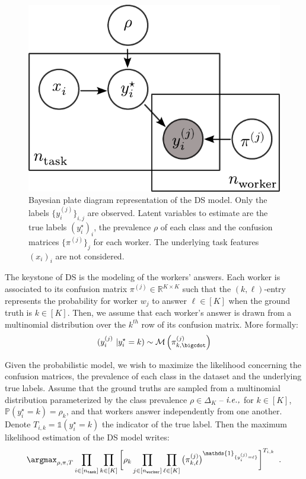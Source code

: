 \begin{figure}[htb]
    \centering
    \includegraphics[width=.65\textwidth]{chapters/images/bayesien_plaque_ds.pdf}
    \caption{Bayesian plate diagram representation of the DS model. Only the labels $\{y_i^{(j)}\}_{i,j}$ are observed. Latent variables to estimate are the true labels $(y_i^\star)_i$, the prevalence $\rho$ of each class and the confusion matrices $\{\pi^{(j)}\}_j$ for each worker. The underlying task features $(x_i)_i$ are not considered.}
    \label{fig:plaque_ds}
\end{figure}

The keystone of DS is the modeling of the workers' answers.
Each worker is associated to its confusion matrix $\pi^{(j)}\in\mathbb{R}^{K\times K}$ such that the $(k,\ell)$-entry represents the probability for worker $w_j$ to answer $\ell\in[K]$ when the ground truth is $k\in[K]$.
Then, we assume that each worker's answer is drawn from a multinomial distribution over the $k^{th}$ row of its confusion matrix.
More formally:
\begin{equation}\label{eq:ds_multinomial}
    (y_i^{(j)}\ | y_i^\star = k) \sim \mathcal{M}\left(\pi^{(j)}_{k,\bigcdot}\right)
\end{equation}

Given the probabilistic model, we wish to maximize the likelihood concerning the confusion matrices, the prevalence of each class in the dataset and the underlying true labels.
Assume that the ground truths are sampled from a multinomial distribution parameterized by the class prevalence $\rho\in\Delta_K$ -- $\emph{i.e.,}$ for $k\in[K]$, $\mathbb{P}(y_i^\star=k)=\rho_k$, and that workers answer independently from one another.
Denote $T_{i,k}=\mathds{1}(y_i^\star=k)$ the indicator of the true label.
Then the maximum likelihood estimation of the DS model writes:
\begin{equation}\label{eq:ds_likelihood}
\argmax_{\rho,\pi,T}\displaystyle\prod_{i\in [n_{\texttt{task}}]}\prod_{k \in [K]}\bigg[\rho_k\prod_{j\in [n_{\texttt{worker}}]}
    \prod_{\ell\in [K]}\big(\pi^{(j)}_{k, \ell}\big)^{\mathds{1}_{\{y_i^{(j)}=\ell\}}}
    \bigg]^{T_{i,k}} \enspace.
\end{equation}

